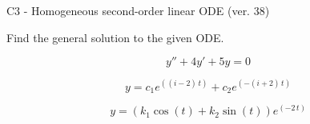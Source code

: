 \begin{exercise}
  \begin{exerciseTitle}C3 - Homogeneous second-order linear ODE (ver. 38)\end{exerciseTitle}
  \begin{exerciseStatement}
    
Find the general solution to the given ODE.

    
\[y''+4y'+5y = 0\]

  \end{exerciseStatement}
  \begin{exerciseAnswer}
    
\[y= c_{1} e^{\left(\left(i - 2\right) \, t\right)} + c_{2} e^{\left(-\left(i + 2\right) \, t\right)}\]

    
\[y= {\left(k_{1} \cos\left(t\right) + k_{2} \sin\left(t\right)\right)} e^{\left(-2 \, t\right)}\]

  \end{exerciseAnswer}
\end{exercise}